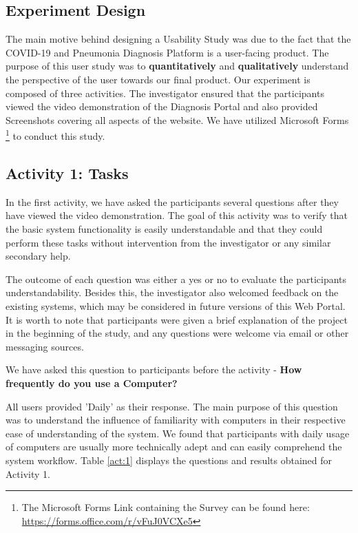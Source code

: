 \subsection{Experiment Design}
The main motive behind designing a Usability Study was due to the fact that the COVID-19 and Pneumonia Diagnosis Platform is a user-facing product. The purpose of this user study was to \textbf{quantitatively} and \textbf{qualitatively} understand the perspective of the user towards our final product. Our experiment is composed of three activities. The investigator ensured that the participants viewed the video demonstration of the Diagnosis Portal and also provided Screenshots covering all aspects of the website. We have utilized Microsoft Forms  \footnote{The Microsoft Forms Link containing the Survey can be found here: \url{https://forms.office.com/r/vFuJ0VCXe5}} to conduct this study.

\subsection{Activity 1: Tasks}

In the first activity, we have asked the participants several questions after they have viewed the video demonstration. The goal of this activity was to verify that the basic system functionality is easily understandable and that they could perform these tasks without intervention from the investigator or any similar secondary help. 

The outcome of each question was either a yes or no to evaluate the participants understandability. Besides this, the investigator also welcomed feedback on the existing systems, which may be considered in future versions of this Web Portal. It is worth to note that participants were given a brief explanation of the project in the beginning of the study, and any questions were welcome via email or other messaging sources. 

We have asked this question to participants before the activity - \textbf{How frequently do you use a Computer?}

All users provided 'Daily' as their response. The main purpose of this question was to understand the influence of familiarity with computers in their respective ease of understanding of the system. We found that 
participants with daily usage of computers are usually more technically adept and can easily comprehend the system workflow. Table \ref{act:1} displays the questions and results obtained for Activity 1. 

